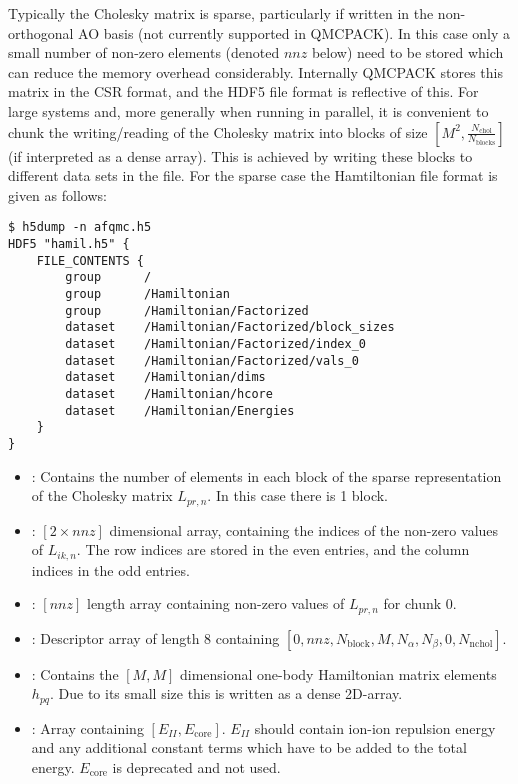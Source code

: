 Typically the Cholesky matrix is sparse, particularly if written in the non-orthogonal AO basis (not currently supported in QMCPACK). In this case only a small number of non-zero elements (denoted $nnz$ below) need to be stored which can reduce the memory overhead considerably.
Internally QMCPACK stores this matrix in the CSR format, and the HDF5 file format is reflective of this.
For large systems and, more generally when running in parallel, it is convenient to chunk the writing/reading of the Cholesky matrix into blocks of size $[M^2,\frac{N_{\mathrm{chol}}}{N_{\mathrm{blocks}}}]$ (if interpreted as a dense array).
This is achieved by writing these blocks to different data sets in the file.
For the sparse case the Hamtiltonian file format is given as follows:
\begin{lstlisting}[style=SHELL,caption=Sample Sparse Cholesky QMCPACK Hamtiltonian.]
$ h5dump -n afqmc.h5
HDF5 "hamil.h5" {
    FILE_CONTENTS {
        group      /
        group      /Hamiltonian
        group      /Hamiltonian/Factorized
        dataset    /Hamiltonian/Factorized/block_sizes
        dataset    /Hamiltonian/Factorized/index_0
        dataset    /Hamiltonian/Factorized/vals_0
        dataset    /Hamiltonian/dims
        dataset    /Hamiltonian/hcore
        dataset    /Hamiltonian/Energies
    }
}
\end{lstlisting}
\begin{itemize}
    \item {}: Contains the number of elements in each block of the sparse representation of the Cholesky matrix $L_{pr,n}$. In this case there is 1 block.
    \item {}: $[2\times nnz]$ dimensional array, containing the indices of the non-zero values of $L_{ik,n}$. The row indices are stored in the even entries, and the column indices in the odd entries.
    \item {}: $[nnz]$ length array containing non-zero values of $L_{pr,n}$ for chunk 0.
    \item {}: Descriptor array of length 8 containing $[0,nnz,N_{\mathrm{block}},M,N_\alpha,N_\beta,0,N_\mathrm{nchol}]$.
    \item {}: Contains the $[M,M]$ dimensional one-body Hamiltonian matrix elements $h_{pq}$. Due to its small size this is written as a dense 2D-array.
    \item {}: Array containing $[E_{II}, E_{\mathrm{core}}]$. $E_{II}$ should contain ion-ion repulsion energy and any additional constant terms which have to be added to the total energy. $E_{\mathrm{core}}$ is deprecated and not used.
\end{itemize}

